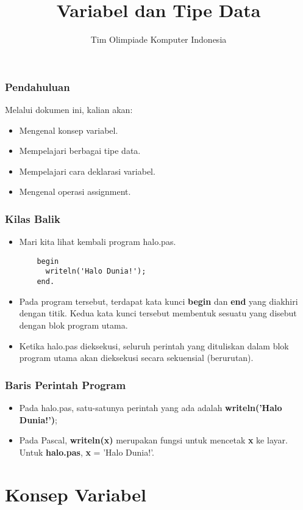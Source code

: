 

\title{Variabel dan Tipe Data}
\author{Tim Olimpiade Komputer Indonesia}
\date{}



\begin{frame}
\titlepage
\end{frame}

\begin{frame}
\frametitle{Pendahuluan}
Melalui dokumen ini, kalian akan:
\begin{itemize}
  \item Mengenal konsep variabel.
  \item Mempelajari berbagai tipe data.
  \item Mempelajari cara deklarasi variabel.
  \item Mengenal operasi assignment.
\end{itemize}
\end{frame}

\begin{frame}[fragile]
\frametitle{Kilas Balik}
\begin{itemize}
  \item Mari kita lihat kembali program halo.pas.
  \begin{lstlisting}
    begin
      writeln('Halo Dunia!');
    end.
  \end{lstlisting}
  \item Pada program tersebut, terdapat kata kunci \textbf{begin} dan \textbf{end} yang diakhiri dengan titik. Kedua kata kunci tersebut membentuk sesuatu yang disebut dengan blok program utama.
  \item Ketika halo.pas dieksekusi, seluruh perintah yang dituliskan dalam blok program utama akan dieksekusi secara sekuensial (berurutan).
\end{itemize}
\end{frame}

\begin{frame}
\frametitle{Baris Perintah Program}
\begin{itemize}
  \item Pada halo.pas, satu-satunya perintah yang ada adalah \textbf{writeln('Halo Dunia!')};
  \item Pada Pascal, \textbf{writeln(x)} merupakan fungsi untuk mencetak \textbf{x} ke layar. Untuk \textbf{halo.pas}, \textbf{x} = 'Halo Dunia!'.
\end{itemize}
\end{frame}

\section{Konsep Variabel}
\frame{\sectionpage}

